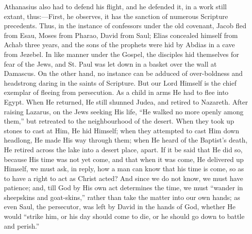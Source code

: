 Athanasius also had to defend his flight, and he defended it, in a
work still extant, thus:—First, he observes, it has the sanction of
numerous Scripture precedents. Thus, in the instance of confessors
under the old covenant, Jacob fled from Esau, Moses from Pharao, David
from Saul; Elias concealed himself from Achab three years, and the
sons of the prophets were hid by Abdias in a cave from Jezebel. In
like manner under the Gospel, the disciples hid themselves for fear of
the Jews, and St. Paul was let down in a basket over the wall at
Damascus. On the other hand, no instance can be adduced of
over-boldness and headstrong daring in the saints of Scripture. But
our Lord Himself is the chief exemplar of fleeing from persecution. As
a child in arms He had to flee into Egypt. When He returned, He still
shunned Judea, and retired to Nazareth. After raising Lazarus, on the
Jews seeking His life, ``He walked no more openly among
them,'' but retreated to the neighbourhood of the desert. When
they took up stones to cast at Him, He hid Himself; when they
attempted to cast Him down headlong, He made His way through them;
when He heard of the Baptist's death, He retired across the lake into
a desert place, apart. If it be said that He did so, because His time
was not yet come, and that when it was come, He delivered up Himself,
we must ask, in reply, how a man can know that his time is come, so as
to have a right to act as Christ acted? And since we do not know, we
must have patience; and, till God by His own act determines the time,
we must ``wander in sheepskins and goat-skins,'' rather than
take the matter into our own hands; as even Saul, the persecutor, was
left by David in the hands of God, whether He would ``strike him, or his day should come to die, or he should go down to battle and
perish.''

